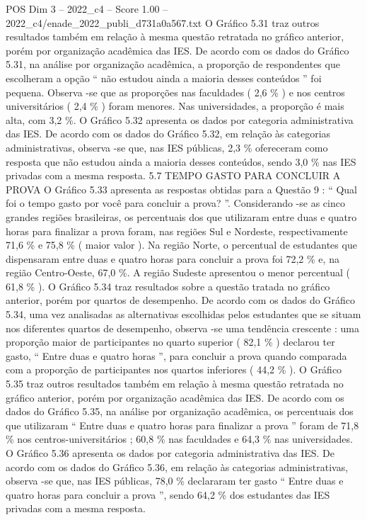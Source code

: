 \begin{textsample}{POS Dim 3 – 2022\_c4 – Score 1.00 – 2022\_c4/enade\_2022\_publi\_d731a0a567.txt}
O Gráfico 5.31 traz outros resultados também em relação à mesma questão retratada no gráfico anterior, porém por organização acadêmica das IES.
De acordo com os dados do Gráfico 5.31, na análise por organização acadêmica, a proporção de respondentes que escolheram a opção “ não estudou ainda a maioria desses conteúdos ” foi pequena.
Observa -se que as proporções nas faculdades ( 2,6 \% ) e nos centros universitários ( 2,4 \% ) foram menores.
Nas universidades, a proporção é mais alta, com 3,2 \%.
O Gráfico 5.32 apresenta os dados por categoria administrativa das IES.
De acordo com os dados do Gráfico 5.32, em relação às categorias administrativas, observa -se que, nas IES públicas, 2,3 \% ofereceram como resposta que não estudou ainda a maioria desses conteúdos, sendo 3,0 \% nas IES privadas com a mesma resposta. 5.7 TEMPO GASTO PARA CONCLUIR A PROVA O Gráfico 5.33 apresenta as respostas obtidas para a Questão 9 : “ Qual foi o tempo gasto por você para concluir a prova? ”.
Considerando -se as cinco grandes regiões brasileiras, os percentuais dos que utilizaram entre duas e quatro horas para finalizar a prova foram, nas regiões Sul e Nordeste, respectivamente 71,6 \% e 75,8 \% ( maior valor ).
Na região Norte, o percentual de estudantes que dispensaram entre duas e quatro horas para concluir a prova foi 72,2 \% e, na região Centro-Oeste, 67,0 \%.
A região Sudeste apresentou o menor percentual ( 61,8 \% ).
O Gráfico 5.34 traz resultados sobre a questão tratada no gráfico anterior, porém por quartos de desempenho.
De acordo com os dados do Gráfico 5.34, uma vez analisadas as alternativas escolhidas pelos estudantes que se situam nos diferentes quartos de desempenho, observa -se uma tendência crescente : uma proporção maior de participantes no quarto superior ( 82,1 \% ) declarou ter gasto, “ Entre duas e quatro horas ”, para concluir a prova quando comparada com a proporção de participantes nos quartos inferiores ( 44,2 \% ).
O Gráfico 5.35 traz outros resultados também em relação à mesma questão retratada no gráfico anterior, porém por organização acadêmica das IES.
De acordo com os dados do Gráfico 5.35, na análise por organização acadêmica, os percentuais dos que utilizaram “ Entre duas e quatro horas para finalizar a prova ” foram de 71,8 \% nos centros-universitários ; 60,8 \% nas faculdades e 64,3 \% nas universidades.
O Gráfico 5.36 apresenta os dados por categoria administrativa das IES.
De acordo com os dados do Gráfico 5.36, em relação às categorias administrativas, observa -se que, nas IES públicas, 78,0 \% declararam ter gasto “ Entre duas e quatro horas para concluir a prova ”, sendo 64,2 \% dos estudantes das IES privadas com a mesma resposta.

\end{textsample}
